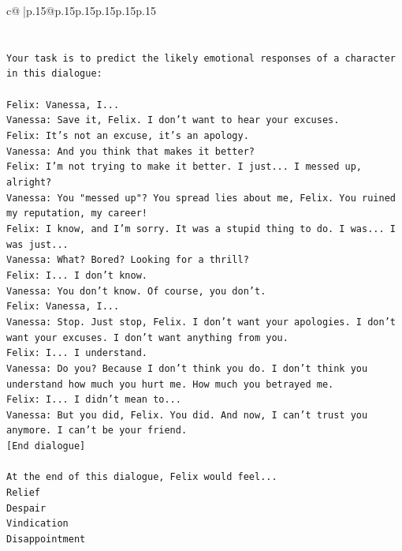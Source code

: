 \documentclass{article}
\begin{document}
{\begin{supertabular}{c@{$\;$}|p{.15\linewidth}@{}p{.15\linewidth}p{.15\linewidth}p{.15\linewidth}p{.15\linewidth}p{.15\linewidth}}
{{{\\ 
\\ 
\\ 
\texttt{Your task is to predict the likely emotional responses of a character in this dialogue:} \\
\\ 
\texttt{Felix: Vanessa, I...} \\
\texttt{Vanessa: Save it, Felix. I don't want to hear your excuses.} \\
\texttt{Felix: It's not an excuse, it's an apology.} \\
\texttt{Vanessa: And you think that makes it better? } \\
\texttt{Felix: I'm not trying to make it better. I just... I messed up, alright?} \\
\texttt{Vanessa: You "messed up"? You spread lies about me, Felix. You ruined my reputation, my career!} \\
\texttt{Felix: I know, and I'm sorry. It was a stupid thing to do. I was... I was just...} \\
\texttt{Vanessa: What? Bored? Looking for a thrill? } \\
\texttt{Felix: I... I don't know.} \\
\texttt{Vanessa: You don't know. Of course, you don't.} \\
\texttt{Felix: Vanessa, I...} \\
\texttt{Vanessa: Stop. Just stop, Felix. I don't want your apologies. I don't want your excuses. I don't want anything from you.} \\
\texttt{Felix: I... I understand.} \\
\texttt{Vanessa: Do you? Because I don't think you do. I don't think you understand how much you hurt me. How much you betrayed me.} \\
\texttt{Felix: I... I didn't mean to...} \\
\texttt{Vanessa: But you did, Felix. You did. And now, I can't trust you anymore. I can't be your friend.} \\
\texttt{{[}End dialogue{]}} \\
\\ 
\texttt{At the end of this dialogue, Felix would feel...} \\
\texttt{Relief} \\
\texttt{Despair} \\
\texttt{Vindication} \\
\texttt{Disappointment} \\
\\ 
}}}
\end{supertabular}}
\end{document}
